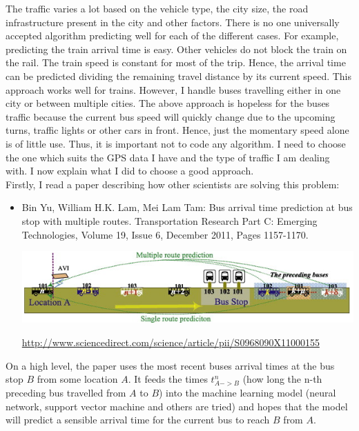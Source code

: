 \documentclass[12pt,a4paper,oneside,openright]{report}
\begin{document}
The traffic varies a lot based on the vehicle type, the city size, the road
infrastructure present in the city and other factors. There is no one universally
accepted algorithm predicting well for each of the different cases. For example, predicting
the train arrival time is easy. Other vehicles do not block the train on the rail. The train
speed is constant for most of the trip. Hence, the arrival time can be predicted dividing the
remaining travel distance by its current speed. This approach works well for trains. However,
I handle buses travelling either in one city or between multiple cities. The above
approach is hopeless for the buses traffic because the current bus speed will quickly
change due to the upcoming turns, traffic lights or other cars in front. Hence, just the
momentary speed alone is of little use. Thus, it is important not to code any algorithm.
I need to choose the one which suits the GPS data I have and the type of traffic I am
dealing with. I now explain what I did to choose a good approach. \\

Firstly, I read a paper describing how other scientists are solving this problem:

\begin{itemize}

\item Bin Yu, William H.K. Lam, Mei Lam Tam: Bus arrival time prediction at
bus stop with multiple routes. Transportation Research Part C: Emerging Technologies,
Volume 19, Issue 6, December 2011, Pages 1157-1170.

\includegraphics[width=\textwidth]{figs/paper.png}

\textcolor{blue}{\url{http://www.sciencedirect.com/science/article/pii/S0968090X11000155}}

\end{itemize}

On a high level, the paper uses the most recent buses arrival times at the bus stop $B$
from some location $A$. It feeds the times $t^{n}_{A->B}$ (how long the n-th
preceding bus travelled from $A$ to $B$) into the machine learning model (neural network,
support vector machine and others are tried) and hopes that the model will predict a
sensible arrival time for the current bus to reach $B$ from $A$. \\
\end{document}
